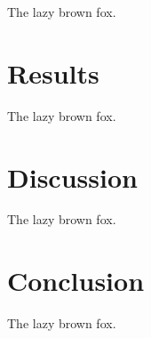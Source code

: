 \begin{refsection}
The lazy brown fox.

\section{Results}

The lazy brown fox.

\section{Discussion}

The lazy brown fox.

\section{Conclusion}

The lazy brown fox.

\printbibliography[heading=subbibliography]

\end{refsection}
